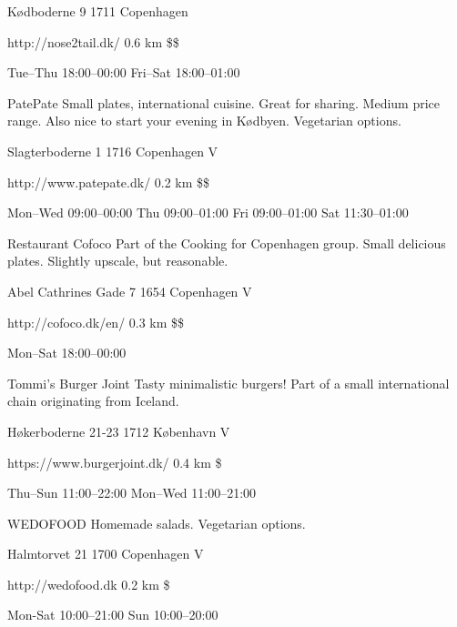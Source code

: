 \begin{left}
\begin{eventitem}
\begin{eventitem}
\begin{eventitem}
\begin{fooditem}
{\begin{addr}
{Kødboderne 9}
{1711 Copenhagen}
\end{addr}}
{http://nose2tail.dk/}
{0.6 km}
{\$\$}
{\begin{ohours}
{Tue–Thu}
{18:00–00:00}
{Fri–Sat}
{18:00–01:00}
{}
{}
{}
{}
\end{ohours}}
\end{fooditem}
\begin{fooditem}
{PatePate}
{Small plates, international cuisine. Great for sharing. Medium price range. Also nice to start your evening in Kødbyen. Vegetarian options. }
{\begin{addr}
{Slagterboderne 1}
{1716 Copenhagen V}
\end{addr}}
{http://www.patepate.dk/}
{0.2 km}
{\$\$}
{\begin{ohours}
{Mon–Wed}
{09:00–00:00}
{Thu}
{09:00–01:00}
{Fri}
{09:00–01:00}
{Sat}
{11:30–01:00}
\end{ohours}}
\end{fooditem}
\begin{fooditem}
{Restaurant Cofoco}
{Part of the Cooking for Copenhagen group. Small delicious plates. Slightly upscale, but reasonable.}
{\begin{addr}
{Abel Cathrines Gade 7}
{1654 Copenhagen V}
\end{addr}}
{http://cofoco.dk/en/}
{0.3 km}
{\$\$}
{\begin{ohours}
{Mon–Sat}
{18:00–00:00}
{}
{}
{}
{}
{}
{}
\end{ohours}}
\end{fooditem}
\begin{fooditem}
{Tommi’s Burger Joint}
{Tasty minimalistic burgers! Part of a small international chain originating from Iceland.}
{\begin{addr}
{Høkerboderne 21-23}
{1712 København V}
\end{addr}}
{https://www.burgerjoint.dk/}
{0.4 km}
{\$}
{\begin{ohours}
{Thu–Sun}
{11:00–22:00}
{Mon–Wed}
{11:00–21:00}
{}
{}
{}
{}
\end{ohours}}
\end{fooditem}
\begin{fooditem}
{WEDOFOOD}
{Homemade salads. Vegetarian options.}
{\begin{addr}
{Halmtorvet 21}
{1700 Copenhagen V}
\end{addr}}
{http://wedofood.dk}
{0.2 km}
{\$}
{\begin{ohours}
{Mon-Sat}
{10:00–21:00}
{Sun}
{10:00–20:00}
{}
{}

\end{ohours}}
\end{fooditem}
\end{eventitem}
\end{eventitem}
\end{eventitem}
\end{left}

